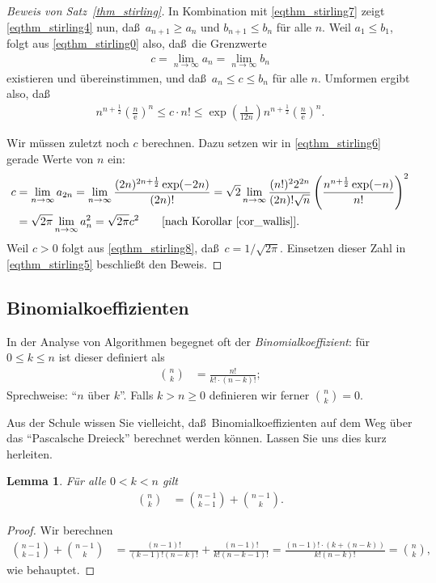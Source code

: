 \documentclass[10pt,reqno]{amsart}
\numberwithin{equation}{section}
\newtheorem{lemma}[definition]{Lemma}
\newcommand\eul{\mathrm{e}}
\newcommand\bc[1]{\left({#1}\right)}
\newcommand\bcfr[2]{\bc{\frac{#1}{#2}}}
\newcommand\Thm{Satz}
\newcommand\Cor{Korollar}
\begin{document}
\begin{proof}[Beweis von \Thm~\ref{thm_stirling}]
	In Kombination mit \eqref{eqthm_stirling7} zeigt \eqref{eqthm_stirling4} nun, da\ss\ $a_{n+1}\geq a_n$ und $b_{n+1}\leq b_n$ f\"ur alle $n$.
	Weil $a_1\leq b_1$, folgt aus \eqref{eqthm_stirling0} also, da\ss\ die Grenzwerte
	\begin{align}\label{eqthm_stirling6}
		c=\lim_{n\to\infty}a_n=\lim_{n\to\infty}b_n
	\end{align}
	existieren und \"ubereinstimmen, und da\ss\ $a_n\leq c\leq b_n$ f\"ur alle $n$.
	Umformen ergibt also, da\ss
	\begin{align}\label{eqthm_stirling5}
		n^{n+\frac12}\bcfr{n}\eul^n\leq c\cdot n!\leq\exp\bcfr1{12n}n^{n+\frac12}\bcfr{n}\eul^n.
	\end{align}

	Wir m\"ussen zuletzt noch $c$ berechnen.
	Dazu setzen wir in \eqref{eqthm_stirling6} gerade Werte von $n$ ein:
	\begin{align}\nonumber
	c&=\lim_{n\to\infty}a_{2n}=\lim_{n\to\infty}\frac{(2n)^{2n+\frac12}\exp(-2n)}{(2n)!}=\sqrt2\lim_{n\to\infty}\frac{(n!)^22^{2n}}{(2n)!\sqrt n}\bcfr{n^{n+\frac12}\exp(-n)}{n!}^2\\
	 &=\sqrt{2\pi}\lim_{n\to\infty}a_n^2=\sqrt{2\pi}c^2\qquad[\mbox{nach \Cor~\ref{cor_wallis}}].\label{eqthm_stirling8}
	\end{align}
	Weil $c>0$ folgt aus \eqref{eqthm_stirling8}, da\ss\ $c=1/\sqrt{2\pi}$.
	Einsetzen dieser Zahl in \eqref{eqthm_stirling5} beschlie\ss t den Beweis.
\end{proof}

\subsection{Binomialkoeffizienten}\label{sec_binom}
In der Analyse von Algorithmen begegnet oft der {\em Binomialkoeffizient}: f\"ur $0\leq k\leq n$ ist dieser definiert als
\begin{align*}
	\binom nk&=\frac{n!}{k!\cdot(n-k)!};
\end{align*}
Sprechweise: ``$n$ \"uber $k$''.
Falls $k>n\geq0$ definieren wir ferner $\binom nk=0$.

Aus der Schule wissen Sie vielleicht, da\ss\ Binomialkoeffizienten auf dem Weg \"uber das ``Pascalsche Dreieck'' berechnet werden k\"onnen.
Lassen Sie uns dies kurz herleiten.

\begin{lemma}\label{lem_pascal}
	F\"ur alle $0<k<n$ gilt
	\begin{align*}
		\binom nk&=\binom{n-1}{k-1}+\binom{n-1}k.
	\end{align*}
\end{lemma}
\begin{proof}
	Wir berechnen
	\begin{align*}
		\binom{n-1}{k-1}+\binom{n-1}k&=\frac{(n-1)!}{(k-1)!(n-k)!}+\frac{(n-1)!}{k!(n-k-1)!}=\frac{(n-1)!\cdot(k+(n-k))}{k!(n-k)!}=\binom nk,
	\end{align*}
	wie behauptet.
\end{proof}
\end{document}
